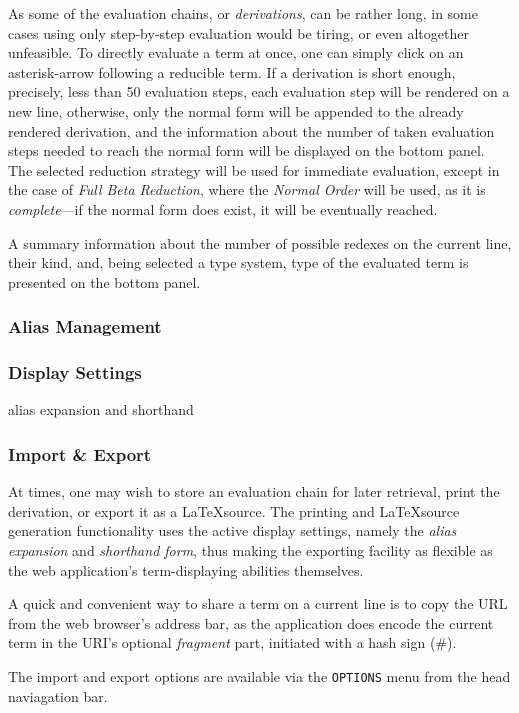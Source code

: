 \documentclass[a4paper,10pt]{article}
\begin{document}
As some of the evaluation chains, or \textit{derivations},
can be rather long, in some cases using
only step-by-step evaluation would be tiring, or even altogether unfeasible.
To directly evaluate a term at once, one can simply click on an asterisk-arrow following
a reducible term. If a derivation is short enough, precisely, less than 50 evaluation steps,
each evaluation step will be rendered on a new line, otherwise, only the normal form
will be appended to the already rendered derivation, and the information
about the number of taken evaluation steps needed to reach the normal form will be
displayed on the bottom panel. The selected reduction strategy 
will be used for immediate evaluation, except in the case of \textit{Full Beta Reduction}, where the
\textit{Normal Order} will be used, as it is \textit{complete}---if the normal form does
exist, it will be eventually reached.

A summary information about the number of possible redexes
on the current line, their kind, and, being selected a type system, type of the evaluated term
is presented on the bottom panel.

\subsubsection{Alias Management}

\subsubsection{Display Settings}
alias expansion and shorthand

\subsubsection{Import \& Export} \label{sec:io}
At times, one may wish to store an evaluation chain for later retrieval, print the derivation,
or export it as a \LaTeX\;source.
The printing and \LaTeX\;source generation functionality uses the active display settings,
namely the \textit{alias expansion} and \textit{shorthand form}, thus making the exporting
facility as flexible as the web application's term-displaying abilities themselves.

A quick and convenient way to share a term on a current line is to copy the
URL from the web browser's address bar, as the application does encode
the current term in the URI's optional \textit{fragment} part, initiated with a hash sign (\#).

The import and export options are available via the \texttt{OPTIONS} menu from the head naviagation bar.
\end{document}
